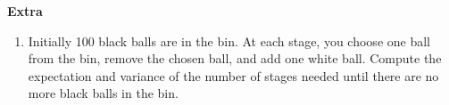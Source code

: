 \documentclass[12pt]{article}%
\newcommand{\0}{{\bf 0}}
\begin{document}
\begin{center}
{\Large{\bf Extra}} 
\end{center}


\begin{enumerate}









\item
Initially 
100 black balls are in the bin. At each stage, you choose one ball from the bin, remove the chosen ball, and add one white ball.
Compute 
the expectation and variance of the number of stages needed until there are no more black balls in the bin.



\end{enumerate}
\end{document}
